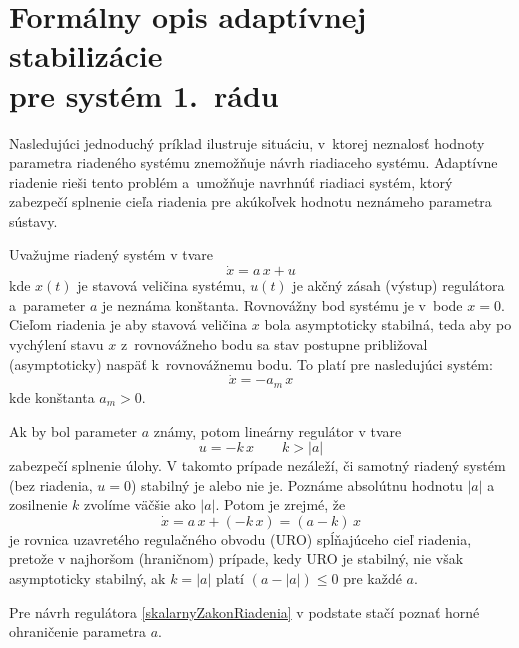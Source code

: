 \documentclass[a4paper, 10pt, ]{article}
\begin{document}
\section[Formálny opis adaptívnej stabilizácie pre systém 1.~rádu]{Formálny opis adaptívnej stabilizácie\\pre systém 1.~rádu}



Nasledujúci jednoduchý príklad ilustruje situáciu, v~ktorej neznalosť hodnoty parametra riadeného systému znemožňuje návrh riadiaceho systému. Adaptívne riadenie rieši tento problém a~umožňuje navrhnúť riadiaci systém, ktorý zabezpečí splnenie cieľa riadenia pre akúkoľvek hodnotu neznámeho parametra sústavy.

Uvažujme riadený systém v tvare
\begin{equation} \label{DRsustavy}
	\dot{x} = a\, x + u
\end{equation}
kde $x(t)$ je stavová veličina systému, $u(t)$ je akčný zásah (výstup) regulátora a~parameter $a$ je neznáma konštanta. Rovnovážny bod systému je v~bode $x=0$. Cieľom riadenia je aby stavová veličina $x$ bola asymptoticky stabilná, teda aby po vychýlení stavu $x$ z~rovnovážneho bodu sa stav postupne približoval (asymptoticky) naspäť k~rovnovážnemu bodu.  To platí pre nasledujúci systém:
\begin{equation} \label{DRstabSustavy}
	\dot{x} = -a_m\, x
\end{equation}
kde konštanta $a_m > 0$.

Ak by bol parameter $a$ známy, potom lineárny regulátor v tvare
\begin{equation} \label{skalarnyZakonRiadenia}
	u = -k\, x \qquad k > \left| a \right|
\end{equation}
zabezpečí splnenie úlohy. V takomto prípade nezáleží, či samotný riadený systém (bez riadenia, $u=0$) stabilný je alebo nie je. Poznáme absolútnu hodnotu $\left| a \right|$ a zosilnenie $k$ zvolíme väčšie ako $\left| a \right|$. Potom je zrejmé, že
\begin{equation} \label{DRURO}
	\dot{x} = a\, x + \left( -k\, x \right) = \left(a-k\right)\,x
\end{equation}
je rovnica uzavretého regulačného obvodu (URO) spĺňajúceho cieľ riadenia, pretože v najhoršom (hraničnom) prípade, kedy URO je stabilný, nie však asymptoticky stabilný, ak $k = \left| a \right|$ platí $\left(a-\left| a \right|\right) \leq 0$ pre každé $a$.

Pre návrh regulátora \eqref{skalarnyZakonRiadenia} v podstate stačí poznať horné ohraničenie parametra $a$.
\end{document}
